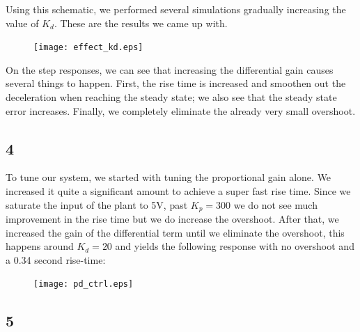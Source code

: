 \documentclass{article}
\begin{document}
Using this schematic, we performed several simulations gradually increasing the value of $K_d$. These are the results we came up with.

\begin{figure}[!htb]
\centering
\texttt{[image: effect\_kd.eps]}
\end{figure}

On the step responses, we can see that increasing the differential gain causes several things to happen. First, the rise time is increased and smoothen out the deceleration when reaching the steady state; we also see that the steady state error increases. Finally, we completely eliminate the already very small overshoot.

\subsection*{4}

To tune our system, we started with tuning the proportional gain alone. We increased it quite a significant amount to achieve a super fast rise time. Since we saturate the input of the plant to 5V, past $K_p = 300$ we do not see much improvement in the rise time but we do increase the overshoot. After that, we increased the gain of the differential term until we eliminate the overshoot, this happens around $K_d = 20$ and yields the following response with no overshoot and a 0.34 second rise-time:

\begin{figure}[!htb]
\centering
\texttt{[image: pd\_ctrl.eps]}
\end{figure}

\subsection*{5}
\end{document}
